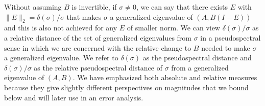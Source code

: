 \documentclass[12pt]{article}
\begin{document}
Without assuming $B$ is invertible, if $\sigma \neq 0$, we can say
that there exists $E$ with $\|E\|_2= \delta(\sigma)/\sigma$ that makes
$\sigma$ a generalized eigenvalue of $(A, B(I-E))$ and this is also
not achieved for any $E$ of smaller norm.  We can view
$\delta(\sigma)/\sigma$ as a relative distance of the set of
generalized eigenvalues from $\sigma$ in a pseudospectral sense in
which we are concerned with the relative change to $B$ needed to make
$\sigma$ a generalized eigenvalue.  We refer to $\delta(\sigma)$ as
the pseudospectral distance and $\delta(\sigma)/\sigma$ as the
relative pseudospectral distance of $\sigma$ from a generalized
eigenvalue of $(A,B)$.  We have emphasized both absolute and relative
measures because they give slightly different perspectives on
magnitudes that we bound below and will later use in an error
analysis.
\end{document}
